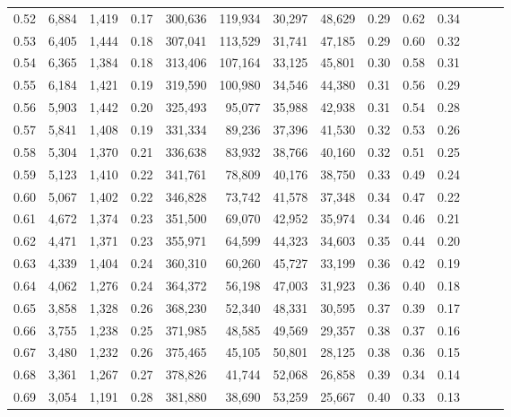 \begin{tabular}{rrrrrrrrrrrrrr}
0.52 &   6,884 &  1,419 &  0.17 &  300,636 &  119,934 &  30,297 &  48,629 &  0.29 &  0.62 &      0.34 \\
0.53 &   6,405 &  1,444 &  0.18 &  307,041 &  113,529 &  31,741 &  47,185 &  0.29 &  0.60 &      0.32 \\
0.54 &   6,365 &  1,384 &  0.18 &  313,406 &  107,164 &  33,125 &  45,801 &  0.30 &  0.58 &      0.31 \\
0.55 &   6,184 &  1,421 &  0.19 &  319,590 &  100,980 &  34,546 &  44,380 &  0.31 &  0.56 &      0.29 \\
0.56 &   5,903 &  1,442 &  0.20 &  325,493 &   95,077 &  35,988 &  42,938 &  0.31 &  0.54 &      0.28 \\
0.57 &   5,841 &  1,408 &  0.19 &  331,334 &   89,236 &  37,396 &  41,530 &  0.32 &  0.53 &      0.26 \\
0.58 &   5,304 &  1,370 &  0.21 &  336,638 &   83,932 &  38,766 &  40,160 &  0.32 &  0.51 &      0.25 \\
0.59 &   5,123 &  1,410 &  0.22 &  341,761 &   78,809 &  40,176 &  38,750 &  0.33 &  0.49 &      0.24 \\
0.60 &   5,067 &  1,402 &  0.22 &  346,828 &   73,742 &  41,578 &  37,348 &  0.34 &  0.47 &      0.22 \\
0.61 &   4,672 &  1,374 &  0.23 &  351,500 &   69,070 &  42,952 &  35,974 &  0.34 &  0.46 &      0.21 \\
0.62 &   4,471 &  1,371 &  0.23 &  355,971 &   64,599 &  44,323 &  34,603 &  0.35 &  0.44 &      0.20 \\
0.63 &   4,339 &  1,404 &  0.24 &  360,310 &   60,260 &  45,727 &  33,199 &  0.36 &  0.42 &      0.19 \\
0.64 &   4,062 &  1,276 &  0.24 &  364,372 &   56,198 &  47,003 &  31,923 &  0.36 &  0.40 &      0.18 \\
0.65 &   3,858 &  1,328 &  0.26 &  368,230 &   52,340 &  48,331 &  30,595 &  0.37 &  0.39 &      0.17 \\
0.66 &   3,755 &  1,238 &  0.25 &  371,985 &   48,585 &  49,569 &  29,357 &  0.38 &  0.37 &      0.16 \\
0.67 &   3,480 &  1,232 &  0.26 &  375,465 &   45,105 &  50,801 &  28,125 &  0.38 &  0.36 &      0.15 \\
0.68 &   3,361 &  1,267 &  0.27 &  378,826 &   41,744 &  52,068 &  26,858 &  0.39 &  0.34 &      0.14 \\
0.69 &   3,054 &  1,191 &  0.28 &  381,880 &   38,690 &  53,259 &  25,667 &  0.40 &  0.33 &      0.13 \\

\end{tabular}
